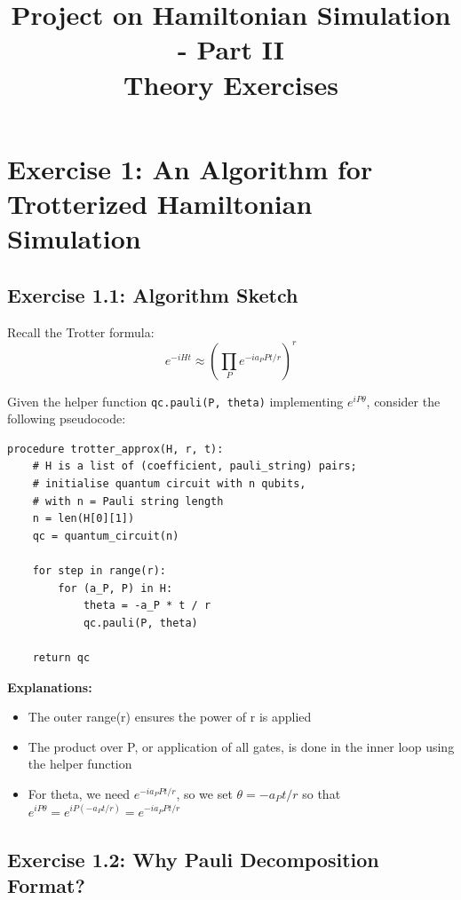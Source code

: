 \documentclass[11pt]{article}
\title{Project on Hamiltonian Simulation - Part II\\Theory Exercises}
\author{}
\date{}
\begin{document}
\maketitle

\section*{Exercise 1: An Algorithm for Trotterized Hamiltonian Simulation}

\subsection*{Exercise 1.1: Algorithm Sketch}

Recall the Trotter formula:
\begin{equation}
e^{-iHt} \approx \left( \prod_P e^{-ia_P P t/r} \right)^r
\end{equation}

Given the helper function \texttt{qc.pauli(P, theta)} implementing $e^{iP\theta}$, consider the following pseudocode:

\begin{verbatim}
procedure trotter_approx(H, r, t):
    # H is a list of (coefficient, pauli_string) pairs;
    # initialise quantum circuit with n qubits,
    # with n = Pauli string length
    n = len(H[0][1])
    qc = quantum_circuit(n)
    
    for step in range(r):
        for (a_P, P) in H:
            theta = -a_P * t / r
            qc.pauli(P, theta)
    
    return qc
\end{verbatim}

\textbf{Explanations:}
\begin{itemize}
    \item The outer range(r) ensures the power of r is applied
    \item The product over P, or application of all gates, is done in the inner loop using the helper function
    \item For theta, we need $e^{-ia_P P t/r}$, so we set $\theta = -a_P t/r$ so that $e^{iP\theta} = e^{iP(-a_P t/r)} = e^{-ia_P P t/r}$
\end{itemize}

\newpage
\subsection*{Exercise 1.2: Why Pauli Decomposition Format?}
\end{document}
